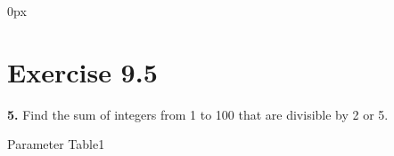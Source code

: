 \documentclass[journal,12pt,twocolumn]{IEEEtran}
\begin{document}
	\parindent 0px
	
	
	
	\title{}
	\author{EE23BTECH11209 - K S Ballvardhan$^{*}$
	}
	\maketitle
	\newpage
	\bigskip
	
	
	
	\section*{Exercise 9.5}
	
	\textbf{5.} Find the sum of integers from 1 to 100 that are divisible by 2 or 5.\\
	
	\solution
        \fi
	
	\begin{table}[ht]
		\centering
		\def\arraystretch{1.5}
		
		\caption{Parameter Table1}
		\label{tab:10.5.3.1}
	\end{table}
	
\end{document}
